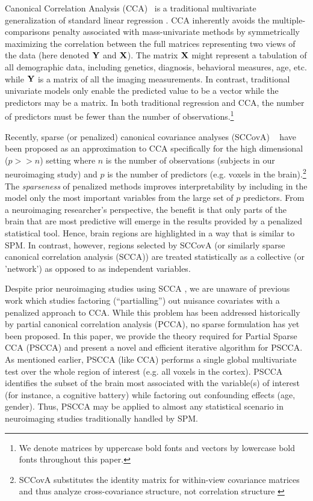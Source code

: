 \documentclass{llncs}
\newcommand{\X}{{\bf X}}
\newcommand{\Y}{{\bf Y}}
\begin{document}
Canonical Correlation Analysis (CCA)~\cite{hotellingcca} is a
traditional multivariate generalization of standard linear regression
\cite{kshirsagar}.  CCA inherently avoids the multiple-comparisons
penalty associated with mass-univariate methods by symmetrically
maximizing the correlation between the full matrices representing two
views of the data (here denoted $\Y$ and $\X$).  The matrix {$\X$}
might represent a tabulation of all demographic data, including
genetics, diagnosis, behavioral measures, age, etc. while $\Y$ is a
matrix of all the imaging measurements.  In contrast, traditional
univariate models only enable the predicted value to be a vector while
the predictors may be a matrix.  In both traditional regression and CCA, the
number of predictors must be fewer than the number of observations.\footnote{We denote matrices by
uppercase bold fonts and vectors by lowercase bold fonts throughout
this paper.} 

Recently, sparse (or penalized) canonical covariance
analyses (SCCovA) ~\cite{parkhomenko,witten,lykou} have been proposed
as an approximation to CCA specifically for the high dimensional ($p
>>n$) setting where $n$ is the number of observations (subjects in our
neuroimaging study) and $p$ is the number of predictors (e.g. voxels
in the brain).\footnote{SCCovA substitutes the identity matrix for
within-view covariance matrices and thus analyze cross-covariance
structure, not correlation structure \cite{cherry}}  The {\em
sparseness} of penalized methods improves interpretability by including in the model
only the most important variables from the large set of $p$
predictors.  From a neuroimaging researcher's perspective, the
benefit is that only parts of the brain that are most predictive will
emerge in the results provided by a penalized statistical tool.
Hence, brain regions are highlighted in a way that is similar to
SPM.  In contrast, however, regions selected by SCCovA (or similarly
sparse canonical correlation analysis (SCCA)) are treated
statistically as a collective (or 'network') as opposed to as
independent variables.

Despite prior neuroimaging studies using SCCA \cite{Avants2010b}, we
are unaware of previous work which studies factoring (``partialling'')
out nuisance covariates with a penalized approach to CCA.  While this
problem has been addressed historically by partial canonical
correlation analysis (PCCA)\cite{timm}, no sparse formulation has yet been
proposed.  In this paper, we provide the theory required for Partial Sparse CCA
(PSCCA) and present a novel and efficient iterative algorithm for
PSCCA. As mentioned earlier, PSCCA (like CCA) performs a single global
multivariate test over the whole region of interest (e.g. all
voxels in the cortex). PSCCA identifies
the subset of the brain most associated with the variable(s) of interest
(for instance, a cognitive battery) while factoring out confounding
effects (age, gender).  Thus, PSCCA may be applied to almost any statistical
scenario in neuroimaging studies traditionally handled by SPM.  
\end{document}
